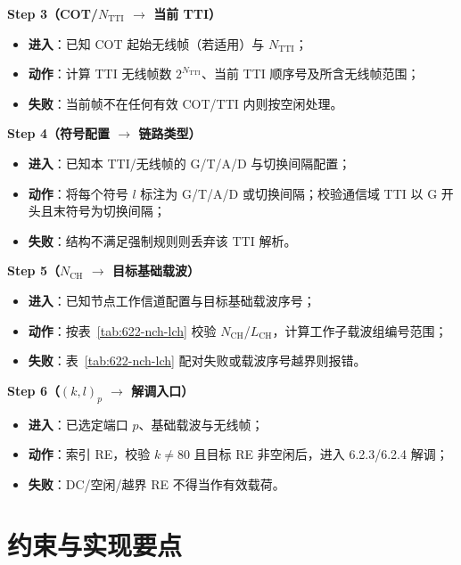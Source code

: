 \documentclass[11pt,a4paper]{ctexart}
\begin{document}
\textbf{Step 3（COT/$N_{\mathrm{TTI}}$ $\rightarrow$ 当前 TTI）}
\begin{itemize}[nosep]
  \item \textbf{进入}：已知 COT 起始无线帧（若适用）与 $N_{\mathrm{TTI}}$；
  \item \textbf{动作}：计算 TTI 无线帧数 $2^{N_{\mathrm{TTI}}}$、当前 TTI 顺序号及所含无线帧范围；
  \item \textbf{失败}：当前帧不在任何有效 COT/TTI 内则按空闲处理。
\end{itemize}

\textbf{Step 4（符号配置 $\rightarrow$ 链路类型）}
\begin{itemize}[nosep]
  \item \textbf{进入}：已知本 TTI/无线帧的 G/T/A/D 与切换间隔配置；
  \item \textbf{动作}：将每个符号 $l$ 标注为 G/T/A/D 或切换间隔；校验通信域 TTI 以 G 开头且末符号为切换间隔；
  \item \textbf{失败}：结构不满足强制规则则丢弃该 TTI 解析。
\end{itemize}

\textbf{Step 5（$N_{\mathrm{CH}}$ $\rightarrow$ 目标基础载波）}
\begin{itemize}[nosep]
  \item \textbf{进入}：已知节点工作信道配置与目标基础载波序号；
  \item \textbf{动作}：按表~\ref{tab:622-nch-lch} 校验 $N_{\mathrm{CH}}$/$L_{\mathrm{CH}}$，计算工作子载波组编号范围；
  \item \textbf{失败}：表~\ref{tab:622-nch-lch} 配对失败或载波序号越界则报错。
\end{itemize}

\textbf{Step 6（$(k,l)_p$ $\rightarrow$ 解调入口）}
\begin{itemize}[nosep]
  \item \textbf{进入}：已选定端口 $p$、基础载波与无线帧；
  \item \textbf{动作}：索引 RE，校验 $k{\neq}80$ 且目标 RE 非空闲后，进入 6.2.3/6.2.4 解调；
  \item \textbf{失败}：DC/空闲/越界 RE 不得当作有效载荷。
\end{itemize}

\section{约束与实现要点}
\end{document}
